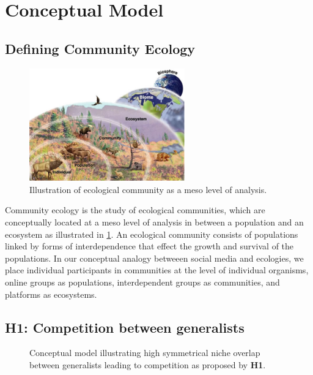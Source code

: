 \documentclass[12pt]{memoir}
\begin{document}
\section{Conceptual Model}

\label{sec:conc-modeld}

\subsection{Defining Community Ecology}

\begin{figure}[t]
\centering
  \includegraphics[width=0.6\textwidth]{resources/ecological_community.jpg}
  \caption{Illustration of ecological community as a meso level of analysis.\label{fig:ecocom}}
\end{figure}
Community ecology is the study of ecological communities, which are conceptually located at a meso level of analysis in between a population and an ecosystem as illustrated in \ref{fig:ecocom}.  An ecological community consists of populations linked by forms of interdependence that effect the growth and survival of the populations.  In our conceptual analogy betweeen social media and ecologies, we place individual participants in communities at the level of individual organisms, online groups as populations, interdependent groups as communities, and platforms as ecosystems. 

\subsection{\textbf{H1:} Competition between generalists}

\begin{figure}[b]
\centering

\caption{Conceptual model illustrating high symmetrical niche overlap between generalists leading to competition as proposed by \textbf{H1}. \label{fig:H1_chart}}
\end{figure}
\end{document}
